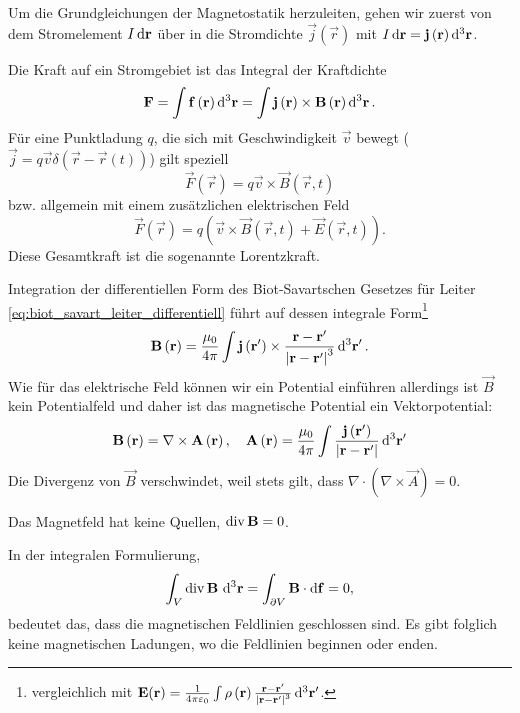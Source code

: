 Um die Grundgleichungen der Magnetostatik herzuleiten, gehen wir zuerst von dem Stromelement $I\diff \vec {r}$ über in die Stromdichte $\vec {j}\left(\vec {r}\right)$ mit $I\diff \vec {r}=\vec {j}\left(\vec {r}\right)\diff^3 \vec {r}$.

Die Kraft auf ein Stromgebiet ist das Integral der Kraftdichte
\begin{equation*}
	\vec {F}=\int \vec f\left(\vec {r}\right)\diffa[3]{\vec{r}}=\int \vec {j}\left(\vec {r}\right)\times \vec {B}\left(\vec {r}\right)\diffa[3]{\vec{r}}.
\end{equation*}
Für eine Punktladung $q$, die sich mit Geschwindigkeit $\vec {v}$ bewegt ($\vec {j}=q\vec {v}\delta \left(\vec {r}-\vec {r}\left(t\right)\right)$) gilt speziell
\begin{equation*}
	\vec F\left(\vec {r}\right)=q\vec {v}\times \vec {B}\left(\vec {r},t\right)
\end{equation*}
bzw. allgemein mit einem zusätzlichen elektrischen Feld
\begin{equation*}
	\vec F\left(\vec {r}\right)=q\left(\vec {v}\times \vec {B}\left(\vec {r},t\right)+\vec {E}\left(\vec {r},t\right)\right).
\end{equation*}
Diese Gesamtkraft ist die sogenannte Lorentzkraft.

Integration der differentiellen Form des Biot-Savartschen Gesetzes für Leiter \eqref{eq:biot_savart_leiter_differentiell} führt auf dessen integrale Form\footnote{vergleichlich mit $\vec {E}(\vec r)=\frac{1}{4\pi \varepsilon _{0}}\int \rho \left(\vec {r}\right)\frac{\vec {r}-\vec {r}'}{\left| \vec {r}-\vec {r}'\right| ^{3}}\diffa[3]{\vec{r}'}$.}
\begin{equation}
	\label{eq:biot_savart}
	\vec {B}\left(\vec {r}\right)=\frac{\mu _{0}}{4\pi }\int \vec {j}\left(\vec {r'}\right)\times \frac{\vec {r}-\vec {r}'}{\left| \vec {r}-\vec {r}'\right| ^{3}}\diffa[3]{\vec{r}'}.
\end{equation}
Wie für das elektrische Feld können wir ein Potential einführen \textendash{} allerdings ist $\vec {B}$ kein Potentialfeld und daher ist das magnetische Potential ein Vektorpotential:
\begin{equation*}
	\vec {B}\left(\vec {r}\right)=\nabla \times \vec {A}\left(\vec {r}\right), \quad\vec {A}\left(\vec {r}\right)=\frac{\mu _{0}}{4\pi }\int \frac{\vec {j}\left(\vec {r}'\right)}{\left| \vec {r}-\vec {r}'\right| }\diffa[3]{\vec{r}'}
\end{equation*}
Die Divergenz von $\vec {B}$ verschwindet, weil stets gilt, dass $\nabla\cdot(\nabla\times \vec A) = 0$.
\begin{formal}
	Das Magnetfeld hat keine Quellen, $\divg \vec {B}=0$.
\end{formal}
In der integralen Formulierung,
\begin{equation*}
	\int _{V}\divg \vec {B}\,\diffa[3]{\vec{r}}=\int _{\partial V}\vec {B}\cdot \diff \vec {f}=0,
\end{equation*}
bedeutet das, dass die magnetischen Feldlinien geschlossen sind. Es gibt folglich keine magnetischen Ladungen, wo die Feldlinien beginnen oder enden.

